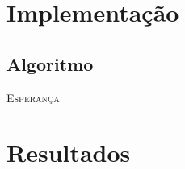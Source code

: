 \documentclass[
	12pt,				%
	openright,			%
	oneside,			%
	a4paper,			%
	chapter=TITLE,		%
	english,			%
	french,				%
	spanish,			%
	brazil				%
	]{abntex2}
\theoremstyle{definition}
\begin{document}
\lipsum[2-3]

\chapter{Implementação}
\label{cap:implementacao}

\section{Algoritmo}

\begin{algorithm}[H]
   \SetAlgoLined
   \label{alg1}
   \caption{\textsc{Esperança}}
 \end{algorithm}

\chapter{Resultados}
\label{cap:resultados}
\end{document}
